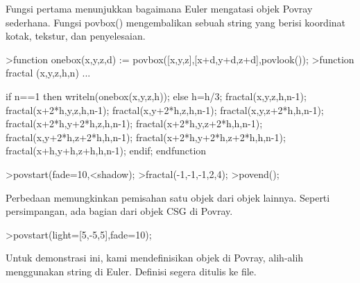 \documentclass[a4paper,10pt]{article}
\begin{document}
\begin{eulernotebook}
\begin{eulercomment}
\begin{eulercomment}
\begin{eulercomment}
Fungsi pertama menunjukkan bagaimana Euler mengatasi objek Povray
sederhana. Fungsi povbox() mengembalikan sebuah string yang berisi
koordinat kotak, tekstur, dan penyelesaian.
\end{eulercomment}
\begin{eulerprompt}
>function onebox(x,y,z,d) := povbox([x,y,z],[x+d,y+d,z+d],povlook());
>function fractal (x,y,z,h,n) ...
\end{eulerprompt}
\begin{eulerudf}
   if n==1 then writeln(onebox(x,y,z,h));
   else
     h=h/3;
     fractal(x,y,z,h,n-1);
     fractal(x+2*h,y,z,h,n-1);
     fractal(x,y+2*h,z,h,n-1);
     fractal(x,y,z+2*h,h,n-1);
     fractal(x+2*h,y+2*h,z,h,n-1);
     fractal(x+2*h,y,z+2*h,h,n-1);
     fractal(x,y+2*h,z+2*h,h,n-1);
     fractal(x+2*h,y+2*h,z+2*h,h,n-1);
     fractal(x+h,y+h,z+h,h,n-1);
   endif;
  endfunction
\end{eulerudf}
\begin{eulerprompt}
>povstart(fade=10,<shadow);
>fractal(-1,-1,-1,2,4);
>povend();
\end{eulerprompt}
\begin{eulercomment}
Perbedaan memungkinkan pemisahan satu objek dari objek lainnya.
Seperti persimpangan, ada bagian dari objek CSG di Povray.
\end{eulercomment}
\begin{eulerprompt}
>povstart(light=[5,-5,5],fade=10);
\end{eulerprompt}
\begin{eulercomment}
Untuk demonstrasi ini, kami mendefinisikan objek di Povray, alih-alih
menggunakan string di Euler. Definisi segera ditulis ke file.


\end{eulercomment}
\end{eulercomment}
\end{eulercomment}
\end{eulernotebook}
\end{document}
